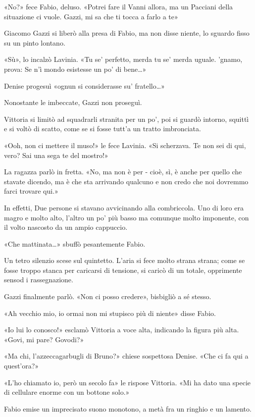 «No?» fece Fabio, deluso. «Potrei fare il Vanni allora, ma un  Pacciani della situazione ci vuole. Gazzi, mi sa che ti tocca a farlo a te»

Giacomo Gazzi si liberò alla presa di Fabio, ma non disse niente, lo sguardo fisso su un pinto lontano. 

«Sù», lo incalzò Lavinia. «Tu se' perfetto, merda tu se' merda uguale. 'gnamo, prova: Se n'ì mondo esistesse un po' di bene\ldots»

Denise progesuì «\ldotse ognun si considerasse su' fratello\ldots»

Nonostante le imbeccate, Gazzi non proseguì.

Vittoria si limitò ad squadrarli stranita per un po', poi si guardò intorno, squittì e si voltò di scatto, come se si fosse tutt'a un tratto imbronciata.

«Ooh, non ci mettere il muso!» le fece Lavinia. «Si scherzava. Te non sei di qui, vero? Sai una sega te del mostro!»

La ragazza parlò in fretta. «No, ma non è per - cioè, sì, è anche per quello che stavate dicendo, ma è che sta arrivando qualcuno e non credo che noi dovremmo farci trovare qui.» 

In effetti, Due persone si stavano avvicinando alla combriccola. Uno di loro era magro e molto alto, l'altro un po' più basso ma comunque molto imponente, con il volto nascosto da un ampio cappuccio.

«Che mattinata\ldots» sbuffò pesantemente Fabio.

Un tetro silenzio scese sul quintetto. L'aria si fece molto strana strana; come se fosse troppo stanca per caricarsi di tensione, si caricò di un totale, opprimente sensod i rassegnazione.

Gazzi finalmente parlò. «Non ci posso credere», bisbigliò a sé stesso.

«Ah vecchio mio, io ormai non mi stupisco più di niente» disse Fabio.

«Io lui lo conosco!» esclamò Vittoria a voce alta, indicando la figura più alta. «Govi, mi pare? Govodi?»

«Ma chi, l'azzeccagarbugli di Bruno?» chiese sospettosa Denise. «Che ci fa qui a quest'ora?»

«L'ho chiamato io, però un secolo fa» le rispose Vittoria. «Mi ha dato una specie di cellulare enorme con un bottone solo.»

Fabio emise un imprecisato suono monotono, a metà fra un ringhio e un lamento.

